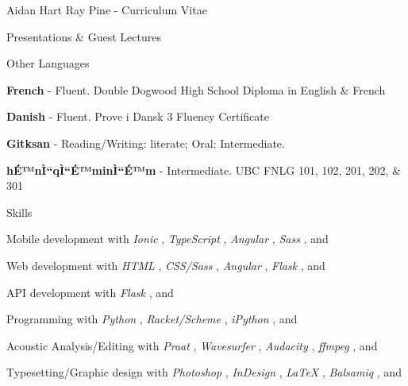 \documentclass[12pt]{letter}
\begin{document}
\begin{cv}{ Aidan Hart Ray Pine  \space - \space   Curriculum Vitae}
\begin{cvlist}{Presentations \& Guest Lectures}
        \end{cvlist}
        \begin{cvlist}{Other Languages}
                            \item \textbf{French} - Fluent. Double Dogwood High School Diploma in English \& French
                            \item \textbf{Danish} - Fluent. Prove i Dansk 3 Fluency Certificate
                            \item \textbf{Gitksan} - Reading/Writing: literate; Oral: Intermediate. 
                            \item \textbf{hÉ™nÌ“qÌ“É™minÌ“É™m} - Intermediate. UBC FNLG 101, 102, 201, 202, \& 301
                    \end{cvlist}
        
         \begin{cvlist}{Skills}
                        \item Mobile development with  \textit{Ionic} ,  \textit{TypeScript} ,  \textit{Angular} ,  \textit{Sass} , and                         \item Web development with  \textit{HTML} ,  \textit{CSS/Sass} ,  \textit{Angular} ,  \textit{Flask} , and                         \item API development with  \textit{Flask} , and                         \item Programming with  \textit{Python} ,  \textit{Racket/Scheme} ,  \textit{iPython} , and                         \item Acoustic Analysis/Editing with  \textit{Praat} ,  \textit{Wavesurfer} ,  \textit{Audacity} ,  \textit{ffmpeg} , and                         \item Typesetting/Graphic design with  \textit{Photoshop} ,  \textit{InDesign} ,  \textit{\LaTeX} ,  \textit{Balsamiq} , and                      \end{cvlist}


\end{cv}
\end{document}
